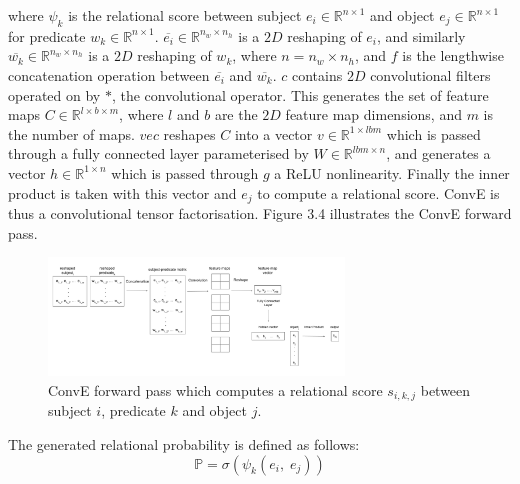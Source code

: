 \noindent where $ \psi_k $ is the relational score between subject $ e_i \in \mathbb{R}^{n \times 1} $ and object $ e_j \in \mathbb{R}^{n \times 1} $ for predicate $ w_k \in \mathbb{R}^{n \times 1} $. $ \overline{e_i} \in \mathbb{R}^{n_w \times n_h} $ is a $ 2D $ reshaping of $ e_i $, and similarly $ \overline{w_k} \in \mathbb{R}^{n_w \times n_h} $ is a $ 2D $ reshaping of $ w_k $, where $ n = n_w \times n_h $, and $ f $ is the lengthwise concatenation operation between $ \overline{e_i} $ and $ \overline{w_k} $. $ c $ contains $ 2D $ convolutional filters operated on by $ * $, the convolutional operator. This generates the set of feature maps $ C \in \mathbb{R}^{l \times b \times m} $, where $ l $ and $ b $ are the $ 2D $ feature map dimensions, and $ m $ is the number of maps. $ vec $ reshapes $ C $ into a vector $ v \in \mathbb{R}^{1 \times lbm} $ which is passed through a fully connected layer parameterised by $ W \in \mathbb{R}^{lbm \times n} $, and generates a vector $ h \in \mathbb{R}^{1 \times n} $ which is passed through $ g $ a ReLU nonlinearity. Finally the inner product is taken with this vector and $ e_j $ to compute a relational score. ConvE is thus a convolutional tensor factorisation. Figure 3.4 illustrates the ConvE forward pass.

\begin{figure}[H]
   	\centering
    	\includegraphics[width=0.7\textwidth, height=0.4\textwidth]{convolutional_entity_representations_final}
	\captionsetup{justification=centering}
	\caption{ConvE forward pass which computes a relational score $ s_{i,k,j} $ between subject $ i $, predicate $ k $ and object $ j $.}
\end{figure}

\newpage

\noindent The generated relational probability is defined as follows: 
\begin{equation}
	\mathbb{P} = \sigma(\psi_k(e_i, \; e_j)) 
\end{equation}

